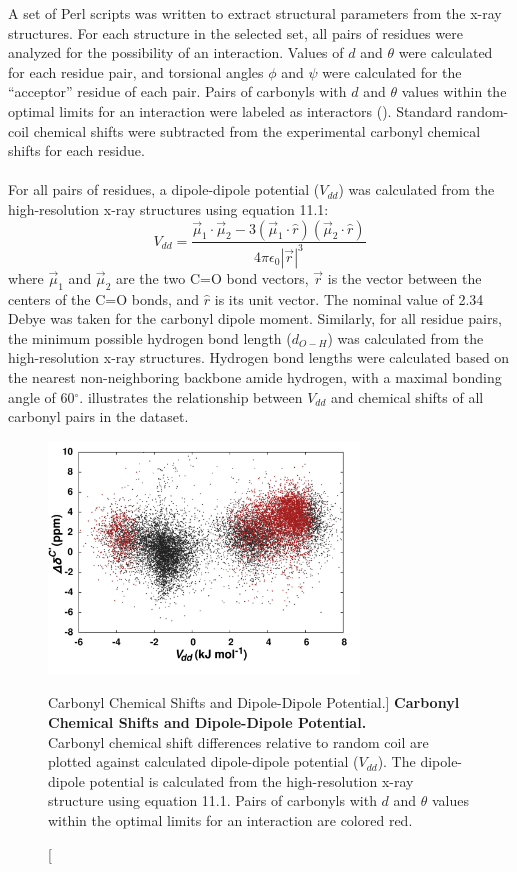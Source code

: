 \begin{doublespace}
A set of Perl scripts was written to extract structural parameters from
the x-ray structures. For each structure in the selected set, all pairs of
residues were analyzed for the possibility of an \npistar{} interaction. Values
of $d$ and $\theta$ were calculated for each residue pair, and torsional angles
$\phi$ and $\psi$ were calculated for the ``acceptor'' residue of each pair.
Pairs of carbonyls with $d$ and $\theta$ values within the optimal limits for
an \npistar{} interaction were labeled as interactors
(). Standard random-coil chemical shifts were
subtracted from the experimental carbonyl \cnmr{} chemical shifts for each
residue.
\\\\
For all pairs of residues, a dipole-dipole potential ($V_{dd}$) was calculated
from the high-resolution x-ray structures using equation 11.1:
\begin{equation}
V_{dd} = \frac{
  \vec{\mu}_1 \cdot \vec{\mu}_2 - 3 
    (\vec{\mu}_1 \cdot \hat{r})
    (\vec{\mu}_2 \cdot \hat{r})}{
  4 \pi \epsilon_0 |\vec{r}|^3}
\end{equation}
where $\vec{\mu}_1$ and $\vec{\mu}_2$ are the two C=O bond vectors, $\vec{r}$
is the vector between the centers of the C=O bonds, and $\hat{r}$ is its unit
vector. The nominal value of 2.34 Debye was taken for the carbonyl dipole
moment. Similarly, for all residue pairs, the minimum possible hydrogen bond
length ($d_{O-H}$) was calculated from the high-resolution x-ray structures.
Hydrogen bond lengths were calculated based on the nearest non-neighboring
backbone amide hydrogen, with a maximal bonding angle of 60$^\circ$.
 illustrates the relationship between
$V_{dd}$ and \cnmr{} chemical shifts of all carbonyl pairs in the dataset.
\end{doublespace}

\begin{figure}
\includegraphics[width=3.25in]{figs/npistar/03-vdd.png}
\caption
      [Carbonyl \cnmr{} Chemical Shifts and Dipole-Dipole Potential.]{
  {\bf Carbonyl \cnmr{} Chemical Shifts and Dipole-Dipole Potential.}
  \\
  Carbonyl \cnmr{} chemical shift differences relative to random coil are
  plotted against calculated dipole-dipole potential ($V_{dd}$). The
  dipole-dipole potential is calculated from the high-resolution x-ray
  structure using equation 11.1. Pairs of carbonyls with $d$ and $\theta$
  values within the optimal limits for an \npistar{} interaction are colored
  red.
}
\label{figure.11.3}
\end{figure}

